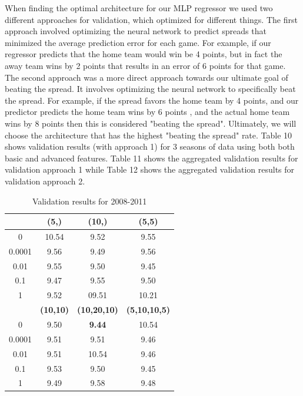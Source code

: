 \documentclass{article}
\begin{document}
When finding the optimal architecture for our MLP regressor we used two different approaches for validation, which optimized for different things. The first approach involved optimizing the neural network to predict spreads that minimized the average prediction error for each game. For example, if our regressor predicts that the home team would win be 4 points, but in fact the away team wins by 2 points that results in an error of 6 points for that game. The second approach was a more direct approach towards our ultimate goal of beating the spread. It involves optimizing the neural network to specifically beat the spread. For example, if the spread favors the home team by 4 points, and our predictor predicts the home team wins by 6 points , and the actual home team wins by 8 points then this is considered "beating the spread". Ultimately, we will choose the architecture that has the highest "beating the spread" rate. Table 10 shows validation results (with approach 1) for 3 seasons of data using both both basic and advanced features. Table 11 shows the aggregated validation results for validation approach 1 while Table 12 shows the aggregated validation results for validation approach 2.

\begin{table}
  \begin{center}
    \begin{tabular}{ | c | c | c | c |}
      \hline
            &             	\textbf{(5,)} & 	\textbf{(10,)} & 	\textbf{(5,5)}   	 \\ \hline
	0  &     	10.54 & 	9.52&	9.55	  \\ \hline
	0.0001 &   9.56 &     	9.49&	9.56 \\ \hline	
	0.01  &    	9.55 &     	9.50& 	9.45    \\ \hline	
	0.1	&	9.47&	9.55 &	9.50  \\ \hline
	1	&	9.52 &	09.51&	 10.21\\ \hline
		&	\textbf{(10,10)} & 	\textbf{(10,20,10)} & 	\textbf{(5,10,10,5)}  \\ \hline
		0&	9.50&	\textbf{9.44}&	10.54	    \\ \hline
		0.0001& 9.51&		9.51&	9.46	    \\ \hline	
		0.01 & 9.51&	10.54&		9.46	    \\ \hline	
		0.1 & 9.53&	9.50&		9.45	    \\ \hline
		1 & 9.49&	9.58&		9.48	    \\ \hline


    \end{tabular}
  \end{center}
  \caption{Validation results for 2008-2011}
\end{table}
\end{document}
